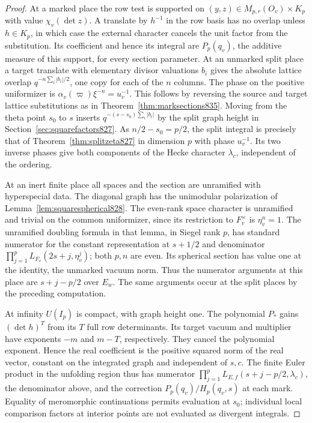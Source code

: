 \documentclass[a4paper,11pt]{article}
\theoremstyle{definition}
\theoremstyle{remark}
\numberwithin{equation}{section}
\begin{document}
\begin{proof}
At a marked place the row test is supported on
\((y,z)\in M_{p,r}(O_v)\times K_p\) with value \(\chi_v(\det z)\).
A translate by \(h^{-1}\) in the row basis has no overlap
unless \(h\in K_p\), in which case the external character
cancels the unit factor from the substitution. Its
coefficient and hence its integral are \(P_p(q_v)\), the
additive measure of this support, for every section parameter.
At an unmarked split place a target translate with elementary
divisor valuations \(b_i\) gives the absolute lattice overlap
\(q^{-n\sum_i|b_i|/2}\), one copy for each of the \(n\) columns.
The phase on the positive uniformizer is
\(\alpha_v(\varpi)\xi^{-n}=u_v^{-1}\). This follows by reversing
the source and target lattice substitutions as in
Theorem~\ref{thm:marksections835}. Moving from the theta point
\(s_0\) to \(s\) inserts \(q^{-(s-s_0)\sum_i|b_i|}\) by the
split graph height in Section~\ref{sec:squarefactors827}.
As \(n/2-s_0=p/2\), the split integral is precisely that
of Theorem~\ref{thm:splitzeta827} in dimension \(p\)
with phase \(u_v^{-1}\). Its two inverse phases give both
components of the Hecke character \(\lambda_c\), independent
of the ordering.

At an inert finite place all spaces and the section are
unramified with hyperspecial data. The diagonal graph has
the unimodular polarization of Lemma~\ref{lem:squarespherical828}.
The even-rank space character is unramified and trivial on
the common uniformizer, since its restriction to \(F_v^\times\)
is \(\eta_v^n=1\). The unramified doubling formula in that
lemma, in Siegel rank \(p\), has standard numerator for the
constant representation at \(s+1/2\) and denominator
\(\prod_{j=1}^p L_{F_v}(2s+j,\eta_v^j)\); both \(p,n\) are
even. Its spherical section has value one at the identity,
the unmarked vacuum norm. Thus the numerator arguments at
this place are \(s+j-p/2\) over \(E_w\). The same arguments
occur at the split places by the preceding computation.

At infinity \(U(I_p)\) is compact, with graph height one.
The polynomial \(P_*\) gains \((\det h)^T\) from its \(T\)
full row determinants. Its target vacuum and multiplier
have exponents \(-m\) and \(m-T\), respectively. They cancel
the polynomial exponent. Hence the real coefficient is
the positive squared norm of the real vector, constant on
the integrated graph and independent of \(s,c\).
The finite Euler product in the unfolding region thus has
numerator \(\prod_{j=1}^p L_{E,f}(s+j-p/2,\lambda_c)\), the
denominator above, and the correction \(P_p(q_v)/H_p(q_v,s)\)
at each mark. Equality of meromorphic continuations permits
evaluation at \(s_0\); individual local comparison factors
at interior points are not evaluated as divergent integrals.


\end{proof}
\end{document}

